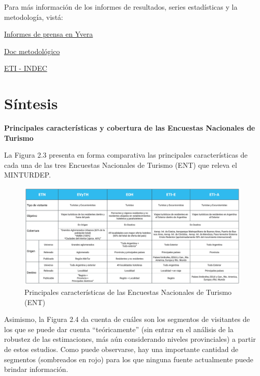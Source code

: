 \documentclass[
  openany]{book}
\begin{document}
Para más información de los informes de resultados, series estadísticas y la metodología, vistá:

\href{https://www.yvera.tur.ar/estadistica/info/turismo-internacional}{Informes de prensa en Yvera}

\href{https://www.yvera.tur.ar/estadistica/documentos/descarga/5d5c00efe6866641938689.pdf}{Doc metodológico}

\href{https://www.indec.gob.ar/indec/web/Nivel4-Tema-3-13-55}{ETI - INDEC}

\hypertarget{suxedntesis}{%
\section{Síntesis}\label{suxedntesis}}

\textbf{Principales características y cobertura de las Encuestas Nacionales de Turismo}

La Figura 2.3 presenta en forma comparativa las principales características de cada una de las tres Encuestas Nacionales de Turismo (ENT) que releva el MINTURDEP.

\begin{figure}

{\centering \includegraphics[width=1\linewidth]{imagenes/figura2.3} 

}

\caption{Principales características de las Encuestas Nacionales de Turismo (ENT)}\label{fig:ent}
\end{figure}

Asimismo, la Figura 2.4 da cuenta de cuáles son los segmentos de visitantes de los que se puede dar cuenta ``teóricamente'' (sin entrar en el análisis de la robustez de las estimaciones, más aún considerando niveles provinciales) a partir de estos estudios.
Como puede observarse, hay una importante cantidad de segmentos (sombreados en rojo) para los que ninguna fuente actualmente puede brindar información.
\end{document}

